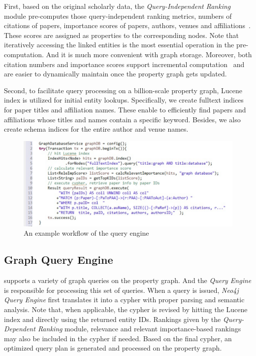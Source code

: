 First, based on the original scholarly data, the {\em Query-Independent Ranking} module pre-computes those query-independent ranking metrics, \ie numbers of citations of papers, importance scores of papers, authors, venues and affiliations~\cite{ma2018query}. These scores are assigned as properties to the corresponding nodes.
Note that iteratively accessing the linked entities is the most essential operation in the pre-computation. And it is much more convenient with graph storage.
Moreover, both citation numbers and importance scores support incremental computation~\cite{ma2018query} and are easier to dynamically maintain once the property graph gets updated.


Second, to facilitate query processing on a billion-scale property graph, Lucene index is utilized for initial entity lookups. Specifically, we create fulltext indices for paper titles and affiliation names. These enable to efficiently find papers and affiliations whose titles and names contain a specific keyword. Besides, we also create schema indices for the entire author and venue names. %


\begin{figure}
\centering
\includegraphics[width=\columnwidth]{queryProcess.pdf}
\vspace{-3ex}
\caption{An example workflow of the query engine}
\label{fig:queryProcess}
\vspace{-2ex}
\end{figure}

\subsection{Graph Query Engine} \label{subsec:qe}
\oursystem supports a variety of graph queries on the property graph. And the {\em Query Engine} is responsible for processing this set of queries. When a query is issued, {\em Neo4j Query Engine} first translates it into a cypher with proper parsing and semantic analysis.
Note that, when applicable, the cypher is revised by hitting the Lucene index and directly using the returned entity IDs. Rankings given by the {\em Query-Dependent Ranking} module, \ie relevance and relevant importance-based rankings may also be included in the cypher if needed. Based on the final cypher, an optimized query plan is generated and processed on the property graph.


